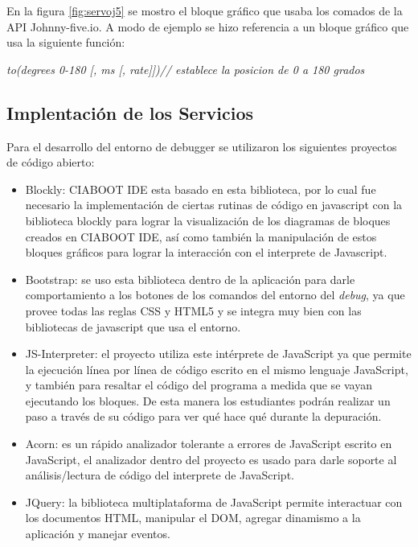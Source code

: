 En la figura \ref{fig:servoj5} se mostro el bloque gráfico que usaba los comados de la API Johnny-five.io. A modo de ejemplo se hizo referencia a un bloque gráfico que usa la siguiente función: 

\emph{to(degrees 0-180 [, ms [, rate]])// establece la posicion de 0 a 180 grados}

\subsection{Implentación de los Servicios}
\label{subsec:Implementación del modelo computacional Servicios}

Para el desarrollo del entorno de debugger se utilizaron los siguientes proyectos de código abierto:

\begin{itemize}
	\item Blockly\citep{blockly}: CIABOOT IDE esta basado en esta biblioteca, por lo cual fue necesario la implementación de ciertas rutinas de código en javascript con la biblioteca blockly para lograr la visualización de los diagramas de bloques creados en CIABOOT IDE, así como también la manipulación de estos bloques gráficos para lograr la interacción con el interprete de Javascript. 
	
	\item Bootstrap\citep{bootstrap}: se uso esta biblioteca dentro de la aplicación para darle comportamiento a los botones de los comandos del entorno del \emph{debug}, ya que provee todas las reglas CSS y HTML5 y se integra muy bien con las bibliotecas de javascript que usa el entorno.
	
	\item JS-Interpreter\citep{js-Interpreter}: el proyecto utiliza este intérprete de JavaScript ya que permite la ejecución línea por línea de código escrito en el mismo lenguaje JavaScript, y también para resaltar el código del programa a medida que se vayan ejecutando los bloques. De esta manera los estudiantes podrán realizar un paso a través de su código para ver qué hace qué durante la depuración. 

	\item Acorn\citep{acorn}: es un rápido analizador tolerante a errores de JavaScript escrito en JavaScript, el analizador dentro del proyecto es usado para darle soporte al análisis/lectura de código del interprete de JavaScript.
	
	\item JQuery\citep{jQuery}: la biblioteca multiplataforma de JavaScript permite interactuar con los documentos HTML, manipular el DOM, agregar dinamismo a la aplicación y manejar eventos.
	

\end{itemize}
